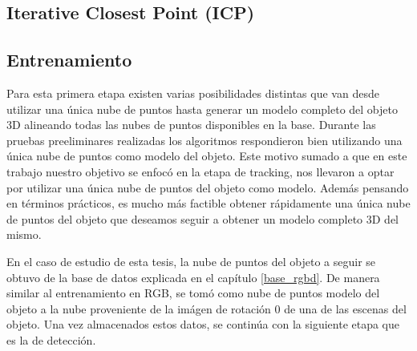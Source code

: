 \subsection{Iterative Closest Point (ICP)}\label{ICP}


\subsection{Entrenamiento}
Para esta primera etapa existen varias posibilidades distintas que van desde utilizar una única nube de puntos hasta generar un modelo completo del objeto 3D alineando todas las nubes de puntos disponibles en la base. Durante las pruebas preeliminares realizadas los algoritmos respondieron bien utilizando una única nube de puntos como modelo del objeto. Este motivo sumado a que en este trabajo nuestro objetivo se enfocó en la etapa de tracking, nos llevaron a optar por utilizar una única nube de puntos del objeto como modelo. Además pensando en términos prácticos, es mucho más factible obtener rápidamente una única nube de puntos del objeto que deseamos seguir a obtener un modelo completo 3D del mismo.

En el caso de estudio de esta tesis, la nube de puntos del objeto a seguir se obtuvo de la base de datos explicada en el capítulo \ref{base_rgbd}. De manera similar al entrenamiento en RGB, se tomó como nube de puntos modelo del objeto a la nube proveniente de la imágen de rotación 0 de una de las escenas del objeto. Una vez almacenados estos datos, se continúa con la siguiente etapa que es la de detección.


